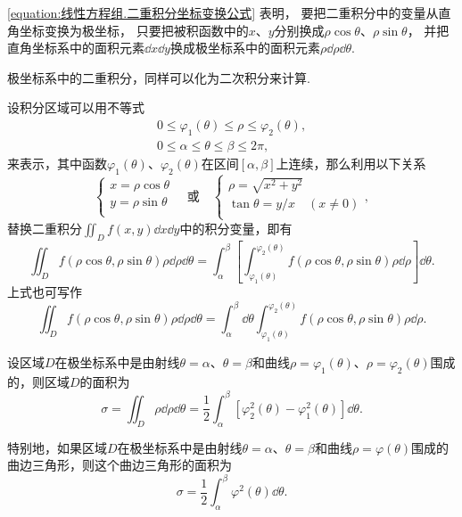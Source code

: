 \cref{equation:线性方程组.二重积分坐标变换公式} 表明，%
要把二重积分中的变量从直角坐标变换为极坐标，%
只要把被积函数中的\(x\)、\(y\)分别换成\(\rho \cos\theta\)、\(\rho \sin\theta\)，%
并把直角坐标系中的面积元素\(\dd{x} \dd{y}\)换成极坐标系中的面积元素\(\rho \dd{\rho} \dd{\theta}\).

极坐标系中的二重积分，同样可以化为二次积分来计算.
\begin{theorem}
设积分区域可以用不等式\begin{gather*}
0 \leqslant \varphi_1(\theta) \leqslant \rho \leqslant \varphi_2(\theta), \\
0 \leqslant \alpha \leqslant \theta \leqslant \beta \leqslant 2\pi,
\end{gather*}来表示，其中函数\(\varphi_1(\theta)\)、\(\varphi_2(\theta)\)在区间\([\alpha,\beta]\)上连续，那么利用以下关系\[
\left\{ \begin{array}{l}
x = \rho\cos\theta \\
y = \rho\sin\theta \\
\end{array} \right.
\quad\text{或}\quad
\left\{ \begin{array}{l}
\rho = \sqrt{x^2+y^2} \\
\tan\theta = y/x \quad (x \neq 0) \\
\end{array} \right.,
\]替换二重积分\(\iint_{D}{f(x,y)\dd{x}\dd{y}}\)中的积分变量，即有
\begin{equation}
\iint_D f(\rho\cos\theta,\rho\sin\theta) \rho \dd{\rho} \dd{\theta}
=\int_{\alpha}^{\beta} \left[
	\int_{\varphi_1(\theta)}^{\varphi_2(\theta)}
		f(\rho\cos\theta,\rho\sin\theta) \rho \dd{\rho} \right] \dd{\theta}.
\end{equation}
上式也可写作
\begin{equation}
\iint_D f(\rho\cos\theta,\rho\sin\theta) \rho \dd{\rho} \dd{\theta}
=\int_{\alpha}^{\beta} \dd{\theta}
	\int_{\varphi_1(\theta)}^{\varphi_2(\theta)}
		f(\rho\cos\theta,\rho\sin\theta) \rho \dd{\rho}.
\end{equation}
\end{theorem}

\begin{corollary}
设区域\(D\)在极坐标系中是由射线\(\theta=\alpha\)、\(\theta=\beta\)和曲线\(\rho=\varphi_1(\theta)\)、\(\rho=\varphi_2(\theta)\)围成的，则区域\(D\)的面积为
\begin{equation}
\sigma = \iint_D \rho \dd{\rho} \dd{\theta}
= \frac{1}{2} \int_{\alpha}^{\beta} [\varphi_2^2(\theta) - \varphi_1^2(\theta)] \dd{\theta}.
\end{equation}

特别地，如果区域\(D\)在极坐标系中是由射线\(\theta=\alpha\)、\(\theta=\beta\)和曲线\(\rho=\varphi(\theta)\)围成的曲边三角形，则这个曲边三角形的面积为
\begin{equation}
\sigma = \frac{1}{2} \int_{\alpha}^{\beta} \varphi^2(\theta) \dd{\theta}.
\end{equation}
\end{corollary}

